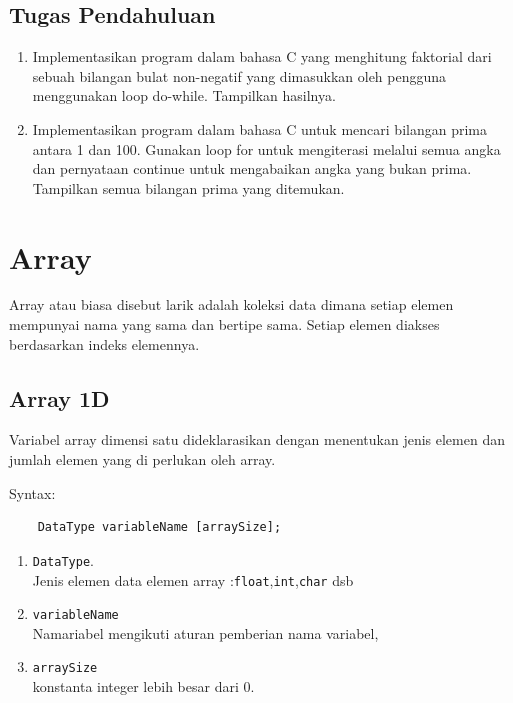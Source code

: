 \subsection{Tugas Pendahuluan}
\begin{enumerate}
	\item Implementasikan program dalam bahasa C yang menghitung faktorial dari sebuah bilangan bulat non-negatif yang dimasukkan oleh pengguna menggunakan loop do-while. Tampilkan hasilnya.
	\item Implementasikan program dalam bahasa C untuk mencari bilangan prima antara 1 dan 100. Gunakan loop for untuk mengiterasi melalui semua angka dan pernyataan continue untuk mengabaikan angka yang bukan prima. Tampilkan semua bilangan prima yang ditemukan.
\end{enumerate}

\section{Array}
Array atau biasa disebut larik adalah koleksi data dimana setiap elemen mempunyai nama yang sama dan bertipe sama. Setiap elemen diakses berdasarkan  indeks elemennya.
\subsection{Array 1D}
Variabel array dimensi satu dideklarasikan dengan menentukan jenis elemen dan jumlah elemen yang di perlukan oleh array.

Syntax:
\begin{verbatim}
    DataType variableName [arraySize];
\end{verbatim}
\begin{enumerate}
	\item \verb*|DataType|.\\
	      Jenis elemen data elemen array :\verb*|float|,\verb*|int|,\verb*|char| dsb
	\item \verb*|variableName|\\
	      Namariabel mengikuti aturan pemberian nama variabel,

	\item \verb*|arraySize| \\
	      konstanta integer lebih besar dari 0. \\
\end{enumerate}

